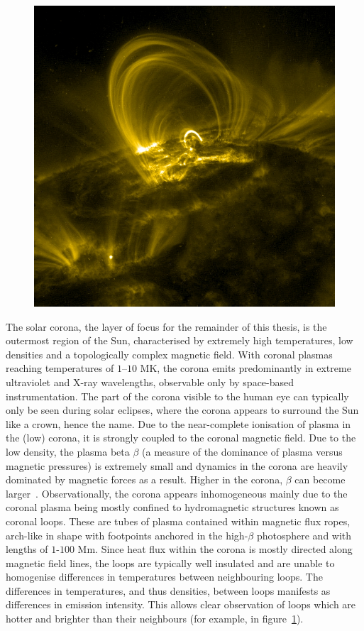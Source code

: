 \begin{figure}[t]
  \centering
  \includegraphics[width=0.5\linewidth]{Traceimage.jpg}
  \label{fig:coronal_loops}
\end{figure}

The solar corona, the layer of focus for the remainder of this thesis, is the outermost region of the Sun, characterised by extremely high temperatures, low densities and a topologically complex magnetic field. With coronal plasmas reaching temperatures of $1$--$10$ MK, the corona emits predominantly in extreme ultraviolet and X-ray wavelengths, observable only by space-based instrumentation. The part of the corona visible to the human eye can typically only be seen during solar eclipses, where the corona appears to surround the Sun like a crown, hence the name. Due to the near-complete ionisation of plasma in the (low) corona, it is strongly coupled to the coronal magnetic field. Due to the low density, the plasma beta $\beta$ (a measure of the dominance of plasma versus magnetic pressures) is extremely small and dynamics in the corona are heavily dominated by magnetic forces as a result. Higher in the corona, $\beta$ can become larger~\cite{gomezPlasmaUpbetaEvolution2019}. Observationally, the corona appears inhomogeneous mainly due to the coronal plasma being mostly confined to hydromagnetic structures known as coronal loops. These are tubes of plasma contained within magnetic flux ropes, arch-like in shape with footpoints anchored in the high-$\beta$ photosphere and with lengths of $1$-$100$ Mm. Since heat flux within the corona is mostly directed along magnetic field lines, the loops are typically well insulated and are unable to homogenise differences in temperatures between neighbouring loops. The differences in temperatures, and thus densities, between loops manifests as differences in emission intensity. This allows clear observation of loops which are hotter and brighter than their neighbours (for example, in figure~\ref{fig:coronal_loops}).

